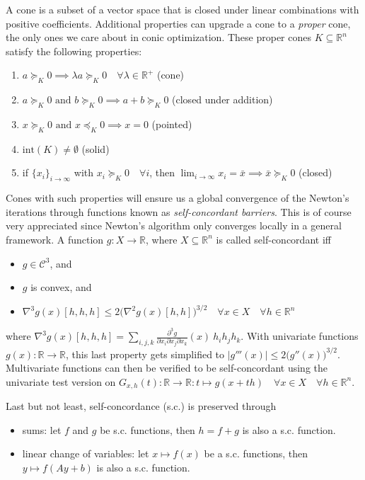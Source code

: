 \documentclass[11 pt]{report}
\begin{document}
A cone is a subset of a vector space that is closed under linear combinations with positive coefficients. Additional properties can upgrade a cone to a \textit{proper} cone, the only ones we care about in conic optimization. These proper cones $K\subseteq \mathbb{R}^n$ satisfy the following properties:
\begin{enumerate}
    \item $a \succeq_K 0 \implies \lambda a \succeq_K 0 \quad \forall \lambda \in \mathbb{R}^+$ (cone)
    \item $a \succeq_K 0 \text{ and } b \succeq_K 0 \implies a + b \succeq_K 0$ (closed under addition)
    \item $x \succeq_K 0 \text{ and } x \preceq_K 0 \implies x = 0$ (pointed)
    \item $\textrm{int}(K) \neq \emptyset$ (solid)
    \item if $\{x_i\}_{i\to\infty}$ with $x_i \succeq_K 0 \quad \forall i$, then $\lim_{i\to\infty} x_i = \bar x \implies \bar x \succeq_K 0$ (closed)
\end{enumerate}

Cones with such properties will ensure us a global convergence of the Newton's iterations through functions known as \textit{self-concordant barriers}. This is of course very appreciated since Newton's algorithm only converges locally in a general framework.
A function $g:X\to\mathbb{R}$, where $X\subseteq \mathbb{R}^n$ is called self-concordant iff
\begin{itemize}[label=--]
    \item $g \in \mathcal{C}^3$, and
    \item $g$ is convex, and
    \item $\nabla^3 g(x) [h, h, h] \leq 2 \big(\nabla^2 g(x) [h, h]\big)^{3/2} \quad \forall x \in X \quad \forall h \in \mathbb{R}^n$
\end{itemize}
where $\nabla^3 g(x) [h, h, h] = \sum_{i, j, k} \frac{\partial^3 g}{\partial x_i \partial x_j \partial x_k}(x)\: h_i h_j h_k$. With univariate functions $g(x) : \mathbb{R} \to \mathbb{R}$, this last property gets simplified to $|g'''(x)| \leq 2 \big( g''(x) \big)^{3/2}$. Multivariate functions can then be verified to be self-concordant using the univariate test version on $G_{x,h}(t) : \mathbb{R} \to \mathbb{R} : t \mapsto g(x + th) \quad \forall x \in X \quad \forall h \in \mathbb{R}^n$.

Last but not least, self-concordance (s.c.) is preserved through
\begin{itemize}[label=--]
    \item sums: let $f$ and $g$ be s.c. functions, then $h = f+g$ is also a s.c. function.
    \item linear change of variables: let $x \mapsto f(x)$ be a s.c. functions, then $y \mapsto f(A y + b)$ is also a s.c. function.
\end{itemize}
\end{document}
